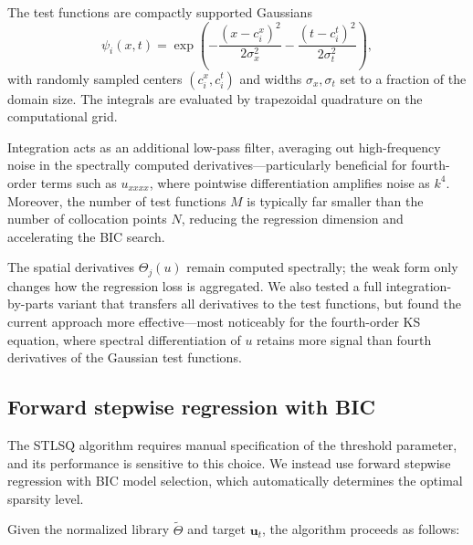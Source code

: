 \documentclass[preprint,12pt]{elsarticle}
\begin{document}
The test functions are compactly supported Gaussians
\begin{equation}
\psi_i(x,t) = \exp\left(-\frac{(x - c_i^x)^2}{2\sigma_x^2} - \frac{(t - c_i^t)^2}{2\sigma_t^2}\right),
\end{equation}
with randomly sampled centers $(c_i^x, c_i^t)$ and widths $\sigma_x, \sigma_t$ set to a fraction of the domain size. The integrals are evaluated by trapezoidal quadrature on the computational grid.

Integration acts as an additional low-pass filter, averaging out high-frequency noise in the spectrally computed derivatives---particularly beneficial for fourth-order terms such as $u_{xxxx}$, where pointwise differentiation amplifies noise as $k^4$. Moreover, the number of test functions $M$ is typically far smaller than the number of collocation points $N$, reducing the regression dimension and accelerating the BIC search.

The spatial derivatives $\Theta_j(u)$ remain computed spectrally; the weak form only changes how the regression loss is aggregated. We also tested a full integration-by-parts variant that transfers all derivatives to the test functions, but found the current approach more effective---most noticeably for the fourth-order KS equation, where spectral differentiation of $u$ retains more signal than fourth derivatives of the Gaussian test functions.

\subsection{Forward stepwise regression with BIC}
\label{sec:stepwise}

The STLSQ algorithm requires manual specification of the threshold parameter, and its performance is sensitive to this choice. We instead use forward stepwise regression with BIC model selection, which automatically determines the optimal sparsity level.

Given the normalized library $\tilde{\Theta}$ and target $\mathbf{u}_t$, the algorithm proceeds as follows:
\end{document}
